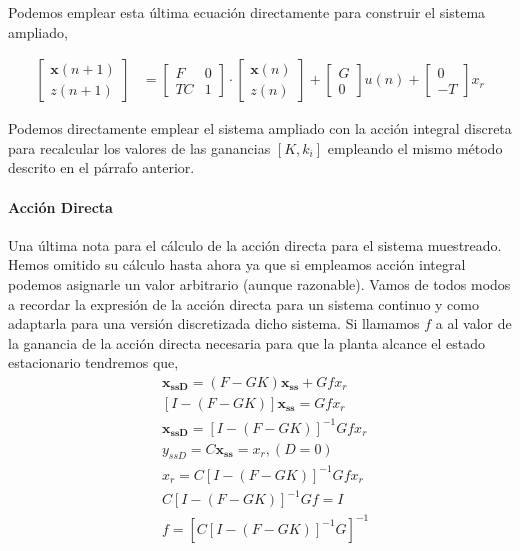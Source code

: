 \documentclass[10pt,a4paper]{report}
\begin{document}
Podemos emplear esta última ecuación directamente para construir el sistema ampliado,

\begin{align}
\begin{bmatrix}
\mathbf{x}(n+1)\\
z(n+1)
\end{bmatrix} &= \begin{bmatrix}
F & 0\\
TC & 1
\end{bmatrix}\cdot\begin{bmatrix}
\mathbf{x}(n)\\
z(n)
\end{bmatrix}+\begin{bmatrix}
G\\
0
\end{bmatrix}u(n) + \begin{bmatrix}
0\\
-T
\end{bmatrix}x_r
\end{align}  

Podemos directamente emplear el sistema ampliado con la acción integral discreta para recalcular los valores de las ganancias $[K,k_i]$ empleando el mismo método descrito en el párrafo anterior.

\paragraph{Acción Directa} Una última nota para el cálculo de la acción directa para el sistema muestreado. Hemos omitido su cálculo hasta ahora ya que si empleamos acción integral podemos asignarle un valor arbitrario (aunque razonable). Vamos de todos modos a recordar la expresión de la acción directa para un sistema continuo y como adaptarla para una versión discretizada dicho sistema. Si llamamos $f$ a al valor de la ganancia de la acción directa necesaria para que la planta alcance el estado estacionario tendremos que,
\begin{align}
&\mathbf{x_{ssD}} = (F -GK)\mathbf{x_{ss}} + Gfx_r\\
&\left[I-(F-GK) \right]\mathbf{x_{ss}} =Gfx_r\\
&\mathbf{x_{ssD}} = \left[I-(F-GK) \right]^{-1}Gfx_r\\
&y_{ssD} = C\mathbf{x_{ss}} = x_r, (D = 0)\\
&x_r = C\left[I-(F-GK) \right]^{-1}Gfx_r\\
&C\left[I-(F-GK) \right]^{-1}Gf = I\\
&f = \left[C\left[I-(F-GK) \right]^{-1}G\right]^{-1}
\end{align}
\end{document}
